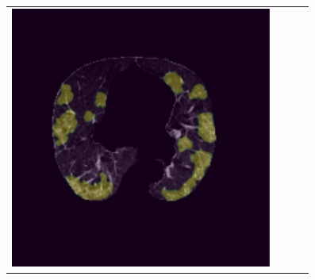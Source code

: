 \begin{figure}
\begin{tabular}{c c c c}
    \includegraphics[scale=0.46]{images/Result1-30-capsnet.jpg}\\
    

\end{tabular}
\end{figure}
